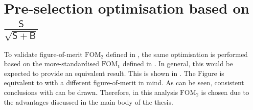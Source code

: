 \chapter{Pre-selection optimisation based on \texorpdfstring{$\frac{\mathsf{S}}{\sqrt{\mathsf{S}+\mathsf{B}}}$}{S/sqrt(S+B)}}\label{sec:appendix_sqrtsplusb_optimisation}

To validate figure-of-merit $\mathrm{FOM}_2$ defined in , the same optimisation is performed based on the more-standardised $\mathrm{FOM}_1$ defined in .
In general, this would be expected to provide an equivalent result.
This is shown in .
The Figure is equivalent to  with a different figure-of-merit in mind.
As can be seen, consistent conclusions with  can be drawn.
Therefore, in this analysis $\mathrm{FOM}_2$ is chosen due to the advantages discussed in the main body of the thesis.

